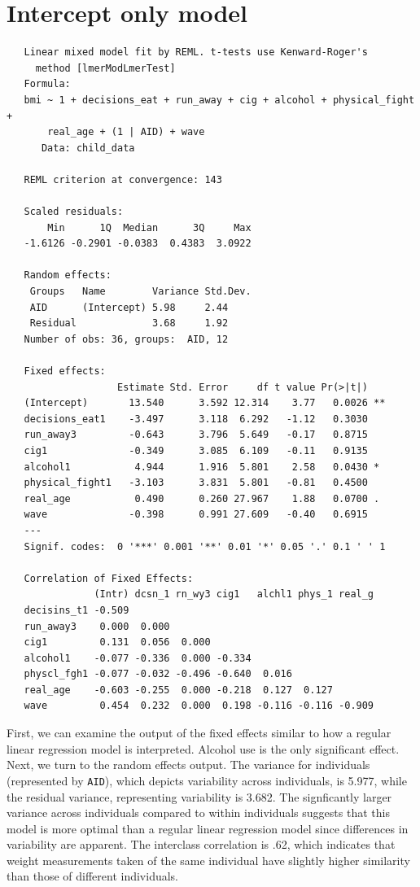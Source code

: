 \documentclass[12pt, twoside]{amherstthesis}
\begin{document}
\hypertarget{intercept-only-model}{%
\section{Intercept only model}\label{intercept-only-model}}
\begin{verbatim}
   Linear mixed model fit by REML. t-tests use Kenward-Roger's
     method [lmerModLmerTest]
   Formula: 
   bmi ~ 1 + decisions_eat + run_away + cig + alcohol + physical_fight +  
       real_age + (1 | AID) + wave
      Data: child_data
   
   REML criterion at convergence: 143
   
   Scaled residuals: 
       Min      1Q  Median      3Q     Max 
   -1.6126 -0.2901 -0.0383  0.4383  3.0922 
   
   Random effects:
    Groups   Name        Variance Std.Dev.
    AID      (Intercept) 5.98     2.44    
    Residual             3.68     1.92    
   Number of obs: 36, groups:  AID, 12
   
   Fixed effects:
                   Estimate Std. Error     df t value Pr(>|t|)   
   (Intercept)       13.540      3.592 12.314    3.77   0.0026 **
   decisions_eat1    -3.497      3.118  6.292   -1.12   0.3030   
   run_away3         -0.643      3.796  5.649   -0.17   0.8715   
   cig1              -0.349      3.085  6.109   -0.11   0.9135   
   alcohol1           4.944      1.916  5.801    2.58   0.0430 * 
   physical_fight1   -3.103      3.831  5.801   -0.81   0.4500   
   real_age           0.490      0.260 27.967    1.88   0.0700 . 
   wave              -0.398      0.991 27.609   -0.40   0.6915   
   ---
   Signif. codes:  0 '***' 0.001 '**' 0.01 '*' 0.05 '.' 0.1 ' ' 1
   
   Correlation of Fixed Effects:
               (Intr) dcsn_1 rn_wy3 cig1   alchl1 phys_1 real_g
   decisins_t1 -0.509                                          
   run_away3    0.000  0.000                                   
   cig1         0.131  0.056  0.000                            
   alcohol1    -0.077 -0.336  0.000 -0.334                     
   physcl_fgh1 -0.077 -0.032 -0.496 -0.640  0.016              
   real_age    -0.603 -0.255  0.000 -0.218  0.127  0.127       
   wave         0.454  0.232  0.000  0.198 -0.116 -0.116 -0.909
\end{verbatim}
First, we can examine the output of the fixed effects similar to how a regular linear regression model is interpreted. Alcohol use is the only significant effect. Next, we turn to the random effects output. The variance for individuals (represented by \texttt{AID}), which depicts variability across individuals, is 5.977, while the residual variance, representing variability is 3.682. The signficantly larger variance across individuals compared to within individuals suggests that this model is more optimal than a regular linear regression model since differences in variability are apparent. The interclass correlation is .62, which indicates that weight measurements taken of the same individual have slightly higher similarity than those of different individuals.
\end{document}
